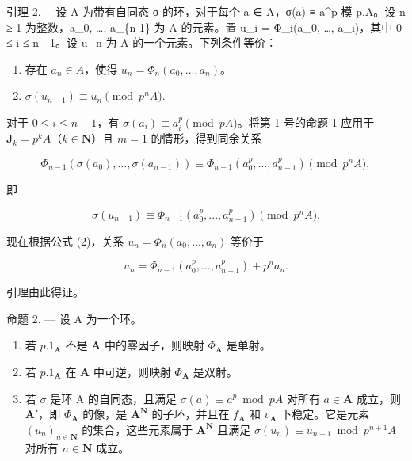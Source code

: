 引理 2.--- 设 A 为带有自同态 σ 的环，对于每个 a ∈ A，σ(a) ≡ a\^{}p 模 p.A。设 n ≥ 1 为整数，a\_0, \ldots, a\_\{n-1\} 为 A 的元素。置 u\_i = Φ\_i(a\_0, \ldots, a\_i)，其中 0 ≤ i ≤ n - 1。设 u\_n 为 A 的一个元素。下列条件等价：

\begin{enumerate}
\def\labelenumi{\alph{enumi})}
\item
  存在 \(a_{n} \in A\)，使得 \(u_{n} = \Phi_{n}(a_{0}, \ldots, a_{n})\)。
\item
  \(\sigma(u_{n-1}) \equiv u_n \pmod{p^nA}\).
\end{enumerate}

对于 \(0 \leqslant i \leqslant n - 1\)，有 \(\sigma(a_i) \equiv a_i^p \pmod{pA}\)。将第 1 号的命题 1 应用于 \(\mathbf{J}_k = p^kA\)（\(k \in \mathbf{N}\)）且 \(m = 1\) 的情形，得到同余关系

\[
\Phi_ {n - 1} \left(\sigma \left(a _ {0}\right), \dots , \sigma \left(a _ {n - 1}\right)\right) \equiv \Phi_ {n - 1} \left(a _ {0} ^ {p}, \dots , a _ {n - 1} ^ {p}\right) \pmod{p ^ {n}A},\tag{7}
\]

即

\[
\sigma (u _ {n - 1}) \equiv \Phi_ {n - 1} (a _ {0} ^ {p},..., a _ {n - 1} ^ {p}) \pmod{p ^ {n}A}.\tag{8}
\]

现在根据公式 (2)，关系 \(u_n = \Phi_n(a_0, \ldots, a_n)\) 等价于

\[
u _ {n} = \Phi_ {n - 1} (a _ {0} ^ {p},..., a _ {n - 1} ^ {p}) + p ^ {n} a _ {n}.\tag{9}
\]

引理由此得证。

命题 2. --- 设 A 为一个环。

\begin{enumerate}
\def\labelenumi{\alph{enumi})}
\item
  若 \(p.1_{\mathbf{A}}\) 不是 \(\mathbf{A}\) 中的零因子，则映射 \(\Phi_{\mathbf{A}}\) 是单射。
\item
  若 \(p.1_{\mathbf{A}}\) 在 \(\mathbf{A}\) 中可逆，则映射 \(\Phi_{\mathbf{A}}\) 是双射。
\item
  若 \(\sigma\) 是环 A 的自同态，且满足 \(\sigma(a) \equiv a^p \bmod pA\) 对所有 \(a \in \mathbf{A}\) 成立，则 \(\mathbf{A}'\)，即 \(\Phi_{\mathbf{A}}\) 的像，是 \(\mathbf{A}^{\mathbf{N}}\) 的子环，并且在 \(f_{\mathbf{A}}\) 和 \(v_{\mathbf{A}}\) 下稳定。它是元素 \((u_n)_{n \in \mathbf{N}}\) 的集合，这些元素属于 \(\mathbf{A}^{\mathbf{N}}\) 且满足 \(\sigma(u_n) \equiv u_{n+1} \bmod p^{n+1}A\) 对所有 \(n \in \mathbf{N}\) 成立。
\end{enumerate}

